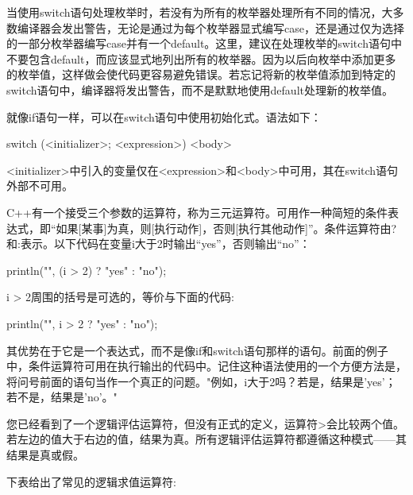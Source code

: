 当使用switch语句处理枚举时，若没有为所有的枚举器处理所有不同的情况，大多数编译器会发出警告，无论是通过为每个枚举器显式编写case，还是通过仅为选择的一部分枚举器编写case并有一个default。这里，建议在处理枚举的switch语句中不要包含default，而应该显式地列出所有的枚举器。因为以后向枚举中添加更多的枚举值，这样做会使代码更容易避免错误。若忘记将新的枚举值添加到特定的switch语句中，编译器将发出警告，而不是默默地使用default处理新的枚举值。


就像if语句一样，可以在switch语句中使用初始化式。语法如下：

\begin{cpp}
switch (<initializer>; <expression>) { <body> }
\end{cpp}

<initializer>中引入的变量仅在<expression>和<body>中可用，其在switch语句外部不可用。


C++有一个接受三个参数的运算符，称为三元运算符。可用作一种简短的条件表达式，即“如果[某事]为真，则[执行动作]，否则[执行其他动作]”。条件运算符由?和:表示。以下代码在变量i大于2时输出“yes”，否则输出“no”：

\begin{cpp}
println("{}", (i > 2) ? "yes" : "no");
\end{cpp}

i > 2周围的括号是可选的，等价与下面的代码:

\begin{cpp}
println("{}", i > 2 ? "yes" : "no");
\end{cpp}

其优势在于它是一个表达式，而不是像if和switch语句那样的语句。前面的例子中，条件运算符可用在执行输出的代码中。记住这种语法使用的一个方便方法是，将问号前面的语句当作一个真正的问题。"例如，i大于2吗？若是，结果是'yes'；若不是，结果是'no'。"


您已经看到了一个逻辑评估运算符，但没有正式的定义，运算符>会比较两个值。若左边的值大于右边的值，结果为真。所有逻辑评估运算符都遵循这种模式——其结果是真或假。

下表给出了常见的逻辑求值运算符:

